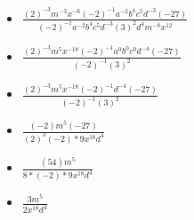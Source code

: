 \begin{enumerate}
\begin{itemize}
  \item {\Large $\frac{(2)^{-3}m^{-3}x^{-6}(-2)^{-1}a^{-2}b^{4}c^{5}d^{-3}(-27)}{(-2)^{-1}a^{-2}b^{4}c^{5}d^{-3}(3)^{2}d^{4}m^{-8}x^{12}}$}
  \item {\Large $\frac{(2)^{-3}m^{5}x^{-18}(-2)^{-1}a^{0}b^{0}c^{0}d^{-4}(-27)}{(-2)^{-1}(3)^{2}}$}
  \item {\Large $\frac{(2)^{-3}m^{5}x^{-18}(-2)^{-1}d^{-4}(-27)}{(-2)^{-1}(3)^{2}}$}
  \item {\Large $\frac{(-2)m^{5}(-27)}{(2)^{3}(-2)*9x^{18}d^{4}}$}
  \item {\Large $\frac{(54)m^{5}}{8*(-2)*9x^{18}d^{4}}$}
  \item {\Large $\frac{3m^{5}}{2x^{18}d^{4}}$}
  \end{itemize}
\end{enumerate}

